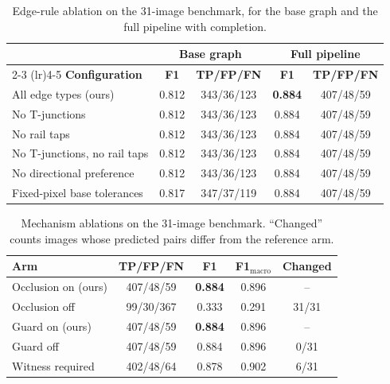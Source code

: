 \documentclass{ieeeaccess}
\begin{document}
\begin{table}[t]
\caption{Edge-rule ablation on the 31-image benchmark, for the base graph and the full pipeline with completion.}
\label{tab:edge_ablation}
\centering
\footnotesize
\setlength{\tabcolsep}{3pt}
\begin{tabular}{lcccc}
\toprule
 & \multicolumn{2}{c}{\textbf{Base graph}} & \multicolumn{2}{c}{\textbf{Full pipeline}} \\
\cmidrule(lr){2-3} \cmidrule(lr){4-5}
\textbf{Configuration} & \textbf{F1} & \textbf{TP/FP/FN} & \textbf{F1} & \textbf{TP/FP/FN} \\
\midrule
All edge types (ours) & 0.812 & 343/36/123 & \textbf{0.884} & 407/48/59 \\
No T-junctions & 0.812 & 343/36/123 & 0.884 & 407/48/59 \\
No rail taps & 0.812 & 343/36/123 & 0.884 & 407/48/59 \\
No T-junctions, no rail taps & 0.812 & 343/36/123 & 0.884 & 407/48/59 \\
No directional preference & 0.812 & 343/36/123 & 0.884 & 407/48/59 \\
Fixed-pixel base tolerances & 0.817 & 347/37/119 & 0.884 & 407/48/59 \\
\bottomrule
\end{tabular}
\end{table}

\begin{table}[t]
\caption{Mechanism ablations on the 31-image benchmark. ``Changed'' counts images whose predicted pairs differ from the reference arm.}
\label{tab:mech_ablation}
\centering
\footnotesize
\setlength{\tabcolsep}{4pt}
\begin{tabular}{lcccc}
\toprule
\textbf{Arm} & \textbf{TP/FP/FN} & \textbf{F1} & \textbf{F1$_{\text{macro}}$} & \textbf{Changed} \\
\midrule
Occlusion on (ours) & 407/48/59 & \textbf{0.884} & 0.896 & -- \\
Occlusion off & 99/30/367 & 0.333 & 0.291 & 31/31 \\
\midrule
Guard on (ours) & 407/48/59 & \textbf{0.884} & 0.896 & -- \\
Guard off & 407/48/59 & 0.884 & 0.896 & 0/31 \\
Witness required & 402/48/64 & 0.878 & 0.902 & 6/31 \\
\bottomrule
\end{tabular}
\end{table}
\end{document}
